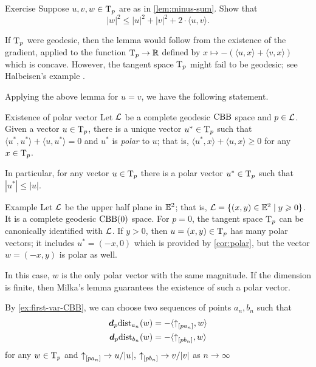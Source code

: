 \begin{thm}{Exercise}\label{ex:|antisum|}
Suppose $u,v, w\in \mathrm{T}_p$ are as in \ref{lem:minus-sum}.
Show that 
\[|w|^2\le |u|^2+|v|^2+2\cdot\langle u,v\rangle.\]

\end{thm}


If $\mathrm{T}_p$ were geodesic, then the lemma would follow from the existence  of the gradient, applied to the function $\mathrm{T}_p\to \mathbb{R}$ defined by $x\mapsto -(\langle u,x\rangle +\langle v,x\rangle )$ which is concave.
However, the tangent space $\mathrm{T}_p$ might fail to be geodesic; see  Halbeisen's example \cite{alexander-kapovitch-petrunin2024}.


Applying the above lemma for $u=v$, we have the following statement.

\begin{thm}{Existence of polar vector}\label{cor:polar}
Let $\mathcal{L}$ be a complete geodesic $\mathrm{CBB}$ space 
and $p\in \mathcal{L}$. 
Given a vector $u\in \mathrm{T}_p$,  there is a unique vector $u^*\in\mathrm{T}_p$ such that $\langle u^*,u^*\rangle +\langle u,u^*\rangle = 0$ and
$u^*$ is \emph{polar} to $u$;
that is,
 $\langle u^*,x\rangle +\langle u,x\rangle \ge 0$ for any $x\in \mathrm{T}_p$.

In particular, for any vector $u\in \mathrm{T}_p$ there is a polar vector $u^*\in\mathrm{T}_p$ such that
$|u^*|\le |u|$.
\end{thm}

\begin{thm}{Example}
Let $\mathcal{L}$ be the upper half plane in $\mathbb{E}^2$;
that is, $\spc{L}\z=\{(x,y)\in \EE^2\mid y\ge 0\}$.
It is a complete geodesic $\mathrm{CBB}(0)$ space.
For $p=0$, the tangent space $\mathrm{T}_p$ can be canonically identified with $\mathcal{L}$.
If $y>0$, then $u=(x,y)\in \mathrm{T}_p$ has many polar vectors;
it includes $u^*=(-x,0)$ which is provided by \ref{cor:polar},
but the vector $w=(-x,y)$ is polar as well.

In this case, $w$ is the only polar vector with the same magnitude.
If the dimension is finite, then Milka's lemma guarantees the existence of such a polar vector.
\end{thm}

By \ref{ex:first-var-CBB}, we can choose two sequences of points $a_n,b_n$ such that 
\begin{align*}
\bm{d}_p\mathrm{dist}_{a_n}(w)&=-\langle{\uparrow}_{[{p}{a_n}]},w\rangle
\\
\bm{d}_p\mathrm{dist}_{b_n}(w)&=-\langle{\uparrow}_{[{p}{b_n}]},w\rangle
\end{align*}
for any $w\in\mathrm{T}_p$ and ${\uparrow}_{[{p}{a_n}]}\to u/|u|$, ${\uparrow}_{[{p}{b_n}]}\to v/|v|$ as $n\to \infty$

